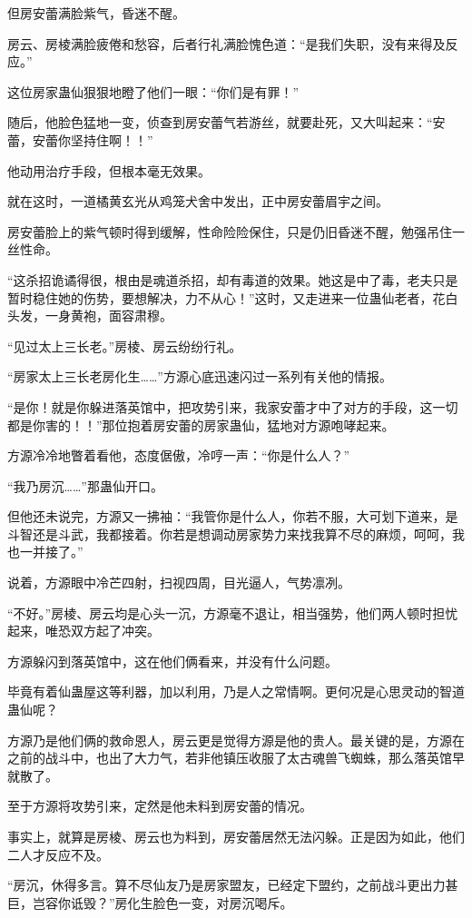 \begin{this_body}
但房安蕾满脸紫气，昏迷不醒。

房云、房棱满脸疲倦和愁容，后者行礼满脸愧色道：“是我们失职，没有来得及反应。”

这位房家蛊仙狠狠地瞪了他们一眼：“你们是有罪！”

随后，他脸色猛地一变，侦查到房安蕾气若游丝，就要赴死，又大叫起来：“安蕾，安蕾你坚持住啊！！”

他动用治疗手段，但根本毫无效果。

就在这时，一道橘黄玄光从鸡笼犬舍中发出，正中房安蕾眉宇之间。

房安蕾脸上的紫气顿时得到缓解，性命险险保住，只是仍旧昏迷不醒，勉强吊住一丝性命。

“这杀招诡谲得很，根由是魂道杀招，却有毒道的效果。她这是中了毒，老夫只是暂时稳住她的伤势，要想解决，力不从心！”这时，又走进来一位蛊仙老者，花白头发，一身黄袍，面容肃穆。

“见过太上三长老。”房棱、房云纷纷行礼。

“房家太上三长老房化生……”方源心底迅速闪过一系列有关他的情报。

“是你！就是你躲进落英馆中，把攻势引来，我家安蕾才中了对方的手段，这一切都是你害的！！”那位抱着房安蕾的房家蛊仙，猛地对方源咆哮起来。

方源冷冷地瞥着看他，态度倨傲，冷哼一声：“你是什么人？”

“我乃房沉……”那蛊仙开口。

但他还未说完，方源又一拂袖：“我管你是什么人，你若不服，大可划下道来，是斗智还是斗武，我都接着。你若是想调动房家势力来找我算不尽的麻烦，呵呵，我也一并接了。”

说着，方源眼中冷芒四射，扫视四周，目光逼人，气势凛冽。

“不好。”房棱、房云均是心头一沉，方源毫不退让，相当强势，他们两人顿时担忧起来，唯恐双方起了冲突。

方源躲闪到落英馆中，这在他们俩看来，并没有什么问题。

毕竟有着仙蛊屋这等利器，加以利用，乃是人之常情啊。更何况是心思灵动的智道蛊仙呢？

方源乃是他们俩的救命恩人，房云更是觉得方源是他的贵人。最关键的是，方源在之前的战斗中，也出了大力气，若非他镇压收服了太古魂兽飞蜘蛛，那么落英馆早就散了。

至于方源将攻势引来，定然是他未料到房安蕾的情况。

事实上，就算是房棱、房云也为料到，房安蕾居然无法闪躲。正是因为如此，他们二人才反应不及。

“房沉，休得多言。算不尽仙友乃是房家盟友，已经定下盟约，之前战斗更出力甚巨，岂容你诋毁？”房化生脸色一变，对房沉喝斥。


\end{this_body}
